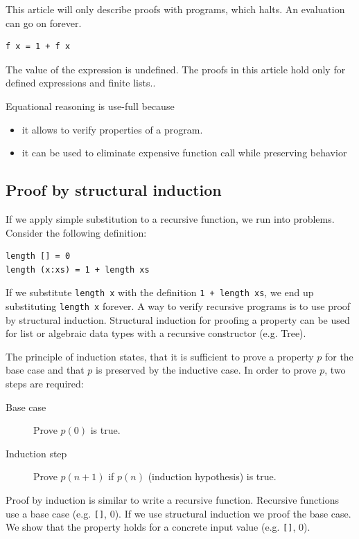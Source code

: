 This article will only describe proofs with programs, which halts. An evaluation can go on forever.
\begin{verbatim}
f x = 1 + f x
\end{verbatim}

The value of the expression is undefined. The proofs in this article hold only for defined expressions and finite lists..

Equational reasoning is use-full because
\begin{itemize}
\item it allows to verify properties of a program.
\item it can be used to eliminate expensive function call while preserving behavior
\end{itemize}

\subsection{Proof by structural induction}
\label{sec:induction}

If we apply simple substitution to a recursive function, we run into problems.
Consider the following definition:
\begin{verbatim}
length [] = 0
length (x:xs) = 1 + length xs
\end{verbatim}
If we substitute \verb|length x| with the definition \verb|1 + length xs|, we end up substituting \verb|length x| forever. A way to verify recursive programs is to use proof by structural induction.  
Structural induction for proofing a property can be used for list or algebraic data types with a recursive constructor (e.g. Tree).

 The principle of induction states, that it is sufficient to prove a property $p$ for the base case and that $p$ is preserved by the inductive case. In order to prove $p$, two steps are required:
 \begin{description}
 \item[Base case] Prove $p(0)$ is true.
 \item[Induction step] Prove $p(n+1)$ if $p(n)$ (induction hypothesis) is true.
 \end{description}

Proof by induction is similar to write a recursive function. Recursive functions use a base case (e.g. \verb|[]|, 0). 
If we use structural induction we proof the base case. We show that the property holds for a concrete input value (e.g. \verb|[]|, 0). 

